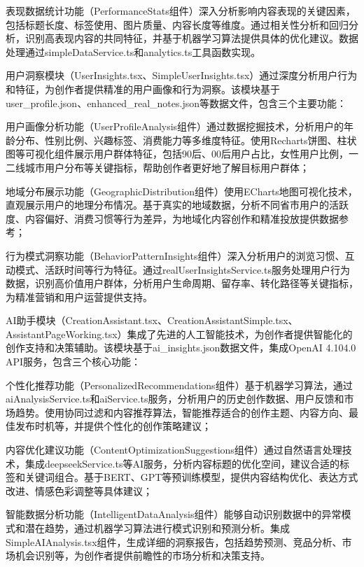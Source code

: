 \documentclass[12pt,a4paper]{article}
\begin{document}
表现数据统计功能（PerformanceStats组件）深入分析影响内容表现的关键因素，包括标题长度、标签使用、图片质量、内容长度等维度。通过相关性分析和回归分析，识别高表现内容的共同特征，并基于机器学习算法提供具体的优化建议。数据处理通过simpleDataService.ts和analytics.ts工具函数实现。

用户洞察模块（UserInsights.tsx、SimpleUserInsights.tsx）通过深度分析用户行为和特征，为创作者提供精准的用户画像和行为洞察。该模块基于user\_profile.json、enhanced\_real\_notes.json等数据文件，包含三个主要功能：

用户画像分析功能（UserProfileAnalysis组件）通过数据挖掘技术，分析用户的年龄分布、性别比例、兴趣标签、消费能力等多维度特征。使用Recharts饼图、柱状图等可视化组件展示用户群体特征，包括90后、00后用户占比，女性用户比例，一二线城市用户分布等关键指标，帮助创作者更好地了解目标用户群体；

地域分布展示功能（GeographicDistribution组件）使用ECharts地图可视化技术，直观展示用户的地理分布情况。基于真实的地域数据，分析不同省市用户的活跃度、内容偏好、消费习惯等行为差异，为地域化内容创作和精准投放提供数据参考；

行为模式洞察功能（BehaviorPatternInsights组件）深入分析用户的浏览习惯、互动模式、活跃时间等行为特征。通过realUserInsightsService.ts服务处理用户行为数据，识别高价值用户群体，分析用户生命周期、留存率、转化路径等关键指标，为精准营销和用户运营提供支持。

AI助手模块（CreationAssistant.tsx、CreationAssistantSimple.tsx、AssistantPageWorking.tsx）集成了先进的人工智能技术，为创作者提供智能化的创作支持和决策辅助。该模块基于ai\_insights.json数据文件，集成OpenAI 4.104.0 API服务，包含三个核心功能：

个性化推荐功能（PersonalizedRecommendations组件）基于机器学习算法，通过aiAnalysisService.ts和aiService.ts服务，分析用户的历史创作数据、用户反馈和市场趋势。使用协同过滤和内容推荐算法，智能推荐适合的创作主题、内容方向、最佳发布时机等，并提供个性化的创作策略建议；

内容优化建议功能（ContentOptimizationSuggestions组件）通过自然语言处理技术，集成deepseekService.ts等AI服务，分析内容标题的优化空间，建议合适的标签和关键词组合。基于BERT、GPT等预训练模型，提供内容结构优化、表达方式改进、情感色彩调整等具体建议；

智能数据分析功能（IntelligentDataAnalysis组件）能够自动识别数据中的异常模式和潜在趋势，通过机器学习算法进行模式识别和预测分析。集成SimpleAIAnalysis.tsx组件，生成详细的洞察报告，包括趋势预测、竞品分析、市场机会识别等，为创作者提供前瞻性的市场分析和决策支持。
\end{document}
